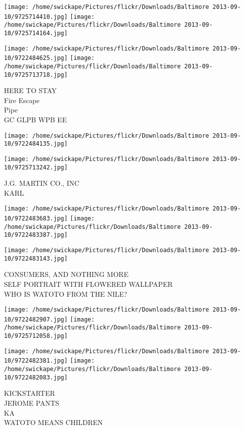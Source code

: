 \documentclass[10pt,letterpaper]{article}
\begin{document}
\texttt{[image: /home/swickape/Pictures/flickr/Downloads/Baltimore 2013-09-10/9725714410.jpg]}
\texttt{[image: /home/swickape/Pictures/flickr/Downloads/Baltimore 2013-09-10/9725714164.jpg]}

\texttt{[image: /home/swickape/Pictures/flickr/Downloads/Baltimore 2013-09-10/9722484625.jpg]}
\texttt{[image: /home/swickape/Pictures/flickr/Downloads/Baltimore 2013-09-10/9725713718.jpg]}

HERE TO STAY\\
Fire Escape\\
Pipe\\
GC GLPB WPB EE\\
\pagebreak

\texttt{[image: /home/swickape/Pictures/flickr/Downloads/Baltimore 2013-09-10/9722484135.jpg]}

\vspace{0.25in}
\texttt{[image: /home/swickape/Pictures/flickr/Downloads/Baltimore 2013-09-10/9725713242.jpg]}

J.G. MARTIN CO., INC\\
KARL\\
\pagebreak

\texttt{[image: /home/swickape/Pictures/flickr/Downloads/Baltimore 2013-09-10/9722483683.jpg]}
\texttt{[image: /home/swickape/Pictures/flickr/Downloads/Baltimore 2013-09-10/9722483387.jpg]}

\vspace{0.25in}
\texttt{[image: /home/swickape/Pictures/flickr/Downloads/Baltimore 2013-09-10/9722483143.jpg]}

CONSUMERS, AND NOTHING MORE\\
SELF PORTRAIT WITH FLOWERED WALLPAPER\\
WHO IS WATOTO FROM THE NILE?\\
\pagebreak

\texttt{[image: /home/swickape/Pictures/flickr/Downloads/Baltimore 2013-09-10/9722482907.jpg]}
\texttt{[image: /home/swickape/Pictures/flickr/Downloads/Baltimore 2013-09-10/9725712058.jpg]}

\texttt{[image: /home/swickape/Pictures/flickr/Downloads/Baltimore 2013-09-10/9722482381.jpg]}
\texttt{[image: /home/swickape/Pictures/flickr/Downloads/Baltimore 2013-09-10/9722482083.jpg]}

KICKSTARTER\\
JEROME PANTS\\
KA\\
WATOTO MEANS CHILDREN\\
\pagebreak
\end{document}
